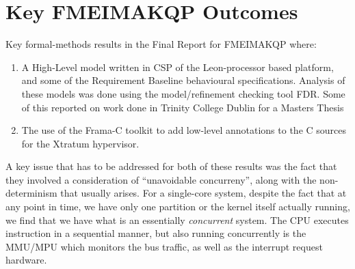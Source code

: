 \section{Key FMEIMAKQP Outcomes}
Key formal-methods results in the Final Report for FMEIMAKQP\cite{FMEIMAKQP-R1}
where:
\begin{enumerate}
  \item
    A High-Level model written in CSP\cite{hoare-1985:commuseque:}
    of the Leon-processor based platform,
    and some of the Requirement Baseline\cite{IMAKQP-D02}
    behavioural specifications.
    Analysis of these models was done using
    the model/refinement checking tool FDR\cite{FDR3}.
    Some of this reported on work done in Trinity College Dublin
    for a Masters Thesis\cite{KH-MCS2016}
  \item
    The use of the Frama-C toolkit\cite{Frama-C:user:Magnesium} to add low-level
    annotations to the C sources for the Xtratum hypervisor\cite{CRM10}.
\end{enumerate}
A key issue that has to be addressed for both of these results
was the fact that they involved a consideration of ``unavoidable concurreny'',
along with the non-determinism that usually arises.
For a single-core system, despite the fact that at any point in time,
we have only one partition or the kernel itself actually running,
we find that we have what is an essentially \emph{concurrent} system.
The CPU executes instruction in a sequential manner,
but also running concurrently is the MMU/MPU which monitors the bus traffic,
as well as the interrupt request hardware.

